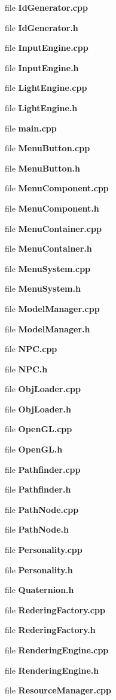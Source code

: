 \begin{DoxyCompactItemize}
file {\bf Id\+Generator.\+cpp}
\item 
file {\bf Id\+Generator.\+h}
\item 
file {\bf Input\+Engine.\+cpp}
\item 
file {\bf Input\+Engine.\+h}
\item 
file {\bf Light\+Engine.\+cpp}
\item 
file {\bf Light\+Engine.\+h}
\item 
file {\bf main.\+cpp}
\item 
file {\bf Menu\+Button.\+cpp}
\item 
file {\bf Menu\+Button.\+h}
\item 
file {\bf Menu\+Component.\+cpp}
\item 
file {\bf Menu\+Component.\+h}
\item 
file {\bf Menu\+Container.\+cpp}
\item 
file {\bf Menu\+Container.\+h}
\item 
file {\bf Menu\+System.\+cpp}
\item 
file {\bf Menu\+System.\+h}
\item 
file {\bf Model\+Manager.\+cpp}
\item 
file {\bf Model\+Manager.\+h}
\item 
file {\bf N\+P\+C.\+cpp}
\item 
file {\bf N\+P\+C.\+h}
\item 
file {\bf Obj\+Loader.\+cpp}
\item 
file {\bf Obj\+Loader.\+h}
\item 
file {\bf Open\+G\+L.\+cpp}
\item 
file {\bf Open\+G\+L.\+h}
\item 
file {\bf Pathfinder.\+cpp}
\item 
file {\bf Pathfinder.\+h}
\item 
file {\bf Path\+Node.\+cpp}
\item 
file {\bf Path\+Node.\+h}
\item 
file {\bf Personality.\+cpp}
\item 
file {\bf Personality.\+h}
\item 
file {\bf Quaternion.\+h}
\item 
file {\bf Redering\+Factory.\+cpp}
\item 
file {\bf Redering\+Factory.\+h}
\item 
file {\bf Rendering\+Engine.\+cpp}
\item 
file {\bf Rendering\+Engine.\+h}
\item 
file {\bf Resource\+Manager.\+cpp}

\end{DoxyCompactItemize}
